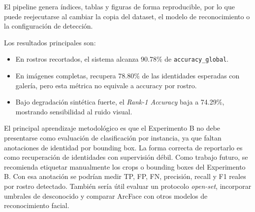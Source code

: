 \documentclass[11pt]{article}
\newcommand{\rankone}{\textit{Rank-1 Accuracy}}
\begin{document}
El pipeline genera índices, tablas y figuras de forma reproducible, por lo que puede reejecutarse al cambiar la copia del dataset, el modelo de reconocimiento o la configuración de detección.

Los resultados principales son:

\begin{itemize}
    \item En rostros recortados, el sistema alcanza 90.78\% de \texttt{accuracy\_global}.
    \item En imágenes completas, recupera 78.80\% de las identidades esperadas con galería, pero esta métrica no equivale a accuracy por rostro.
    \item Bajo degradación sintética fuerte, el \rankone{} baja a 74.29\%, mostrando sensibilidad al ruido visual.
\end{itemize}

El principal aprendizaje metodológico es que el Experimento B no debe presentarse como evaluación de clasificación por instancia, ya que faltan anotaciones de identidad por bounding box. La forma correcta de reportarlo es como recuperación de identidades con supervisión débil. Como trabajo futuro, se recomienda etiquetar manualmente los crops o bounding boxes del Experimento B. Con esa anotación se podrían medir TP, FP, FN, precisión, recall y F1 reales por rostro detectado. También sería útil evaluar un protocolo \textit{open-set}, incorporar umbrales de desconocido y comparar ArcFace con otros modelos de reconocimiento facial.

\newpage


\end{document}
